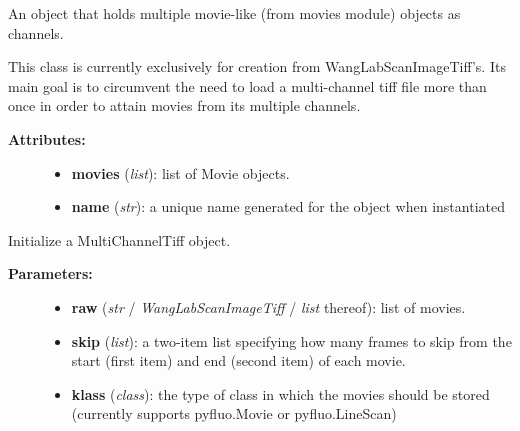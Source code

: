 \documentclass[letterpaper,10pt,english]{sphinxmanual}
\begin{document}
\begin{fulllineitems}
\label{data_structures:tiff.wanglab.MultiChannelTiff}
An object that holds multiple movie-like (from movies module) objects as channels.

This class is currently exclusively for creation from WangLabScanImageTiff's. Its main goal is to circumvent the need to load a multi-channel tiff file more than once in order to attain movies from its multiple channels.
\begin{description}
\item[{\textbf{Attributes:}}] \leavevmode\begin{itemize}
\item {} 
\textbf{movies} (\emph{list}): list of Movie objects.

\item {} 
\textbf{name} (\emph{str}): a unique name generated for the object when instantiated

\end{itemize}

\end{description}

\begin{fulllineitems}
\label{data_structures:tiff.wanglab.MultiChannelTiff.__init__}
Initialize a MultiChannelTiff object.
\begin{description}
\item[{\textbf{Parameters:}}] \leavevmode\begin{itemize}
\item {} 
\textbf{raw} (\emph{str} / \emph{WangLabScanImageTiff} / \emph{list} thereof): list of movies.

\item {} 
\textbf{skip} (\emph{list}): a two-item list specifying how many frames to skip from the start (first item) and end (second item) of each movie.

\item {} 
\textbf{klass} (\emph{class}): the type of class in which the movies should be stored (currently supports pyfluo.Movie or pyfluo.LineScan)


\end{itemize}
\end{description}
\end{fulllineitems}
\end{fulllineitems}
\end{document}
